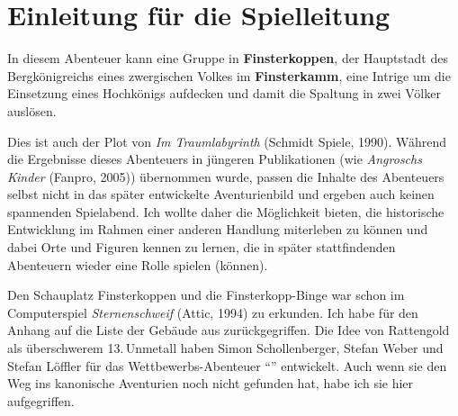 \platz
{}


\lizenz

\hauptteil
\spaltenanfang


\section*{Einleitung für die Spielleitung}
In diesem Abenteuer kann eine Gruppe in \textbf{Finsterkoppen},
der Hauptstadt des Bergkönigreichs eines zwergischen Volkes im \textbf{Finsterkamm},
eine Intrige um die Einsetzung eines Hochkönigs aufdecken und damit die Spaltung in zwei Völker auslösen.

Dies ist auch der Plot von \emph{Im Traumlabyrinth} (Schmidt Spiele, 1990).
Während die Ergebnisse dieses Abenteuers in jüngeren Publikationen (wie \emph{Angroschs Kinder} (Fanpro, 2005))
übernommen wurde, passen die Inhalte des Abenteuers selbst nicht in das später entwickelte Aven\-turien\-bild und ergeben auch keinen spannenden Spielabend.
Ich wollte daher die Möglichkeit bieten, die historische Entwicklung im Rahmen einer anderen Handlung miterleben zu können
und dabei Orte und Figuren kennen zu lernen, die in später stattfindenden Abenteuern wieder eine Rolle spielen (können).

Den Schauplatz Finsterkoppen und die Finsterkopp-Binge war schon im Computerspiel \emph{Sternenschweif} (Attic, 1994) zu erkunden. %
Ich habe für den Anhang auf die Liste der Gebäude aus  zurückgegriffen.
Die Idee von Rattengold als überschwerem 13.\,Unmetall haben Simon Schollenberger, Stefan Weber und Stefan Löffler für das Wettbewerbs-Abenteuer \enquote{} entwickelt.
Auch wenn sie den Weg ins kanonische Aventurien noch nicht gefunden hat, habe ich sie hier aufgegriffen.


